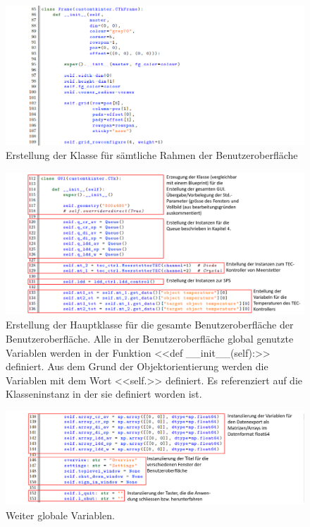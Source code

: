 \begin{appendix}
\begin{landscape}
\begin{figure}[H]
    \centering
    \includegraphics[scale=0.85]{98_images/src/fhnw_pro6m_quellcode_06.png}
    \caption{Erstellung der Klasse für sämtliche Rahmen der Benutzeroberfläche}
    \label{fig:fhnw_pro6m_quellcode_06}
\end{figure}

\begin{figure}[H]
    \centering
    \includegraphics[scale=0.7]{98_images/src/fhnw_pro6m_quellcode_07.png}
    \caption{Erstellung der Hauptklasse für die gesamte Benutzeroberfläche der Benutzeroberfläche. Alle in der Benutzeroberfläche global genutzte Variablen werden in der Funktion <<def __init__(self):>> definiert. Aus dem Grund der Objektorientierung werden die Variablen mit dem Wort <<self.>> definiert. Es referenziert auf die Klasseninstanz in der sie definiert worden ist.}
    \label{fig:fhnw_pro6m_quellcode_07}
\end{figure}

\begin{figure}[H]
    \centering
    \includegraphics[scale=0.75, trim= 1mm 1mm 1mm 1mm, clip]{98_images/src/fhnw_pro6m_quellcode_08.png}
    \caption{Weiter globale Variablen.}
    \label{fig:fhnw_pro6m_quellcode_08}
\end{figure}


\end{landscape}
\end{appendix}
